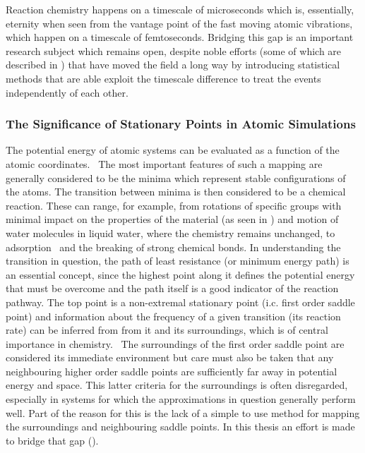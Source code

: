Reaction chemistry happens on a timescale of microseconds which is, essentially, eternity when seen from the vantage point of the fast moving atomic vibrations, which happen on a timescale of femtoseconds.
Bridging this gap is an important research subject which remains open, despite noble efforts (some of which are described in ) that have moved the field a long way by introducing statistical methods that are able exploit the timescale difference to treat the events independently of each other.~\cite{tst-eyring-1935, tst-polanyi-1935, tst-wigner-1938, htst-wert-1949, htst-vineyard-1957, tst-1990}

\subsubsection{The Significance of Stationary Points in Atomic Simulations}
The potential energy of atomic systems can be evaluated as a function of the atomic coordinates.~\cite{born-oppenheimer-1927, schrodinger-equation-1926, kohn-1999}
The most important features of such a mapping are generally considered to be the minima which represent stable configurations of the atoms.
The transition between minima is then considered to be a chemical reaction.
These can range, for example, from rotations of specific groups with minimal impact on the properties of the material (as seen in ) and motion of water molecules in liquid water, where the chemistry remains unchanged, to adsorption~ and the breaking of strong chemical bonds.
In understanding the transition in question, the path of least resistance (or minimum energy path) is an essential concept, since the highest point along it defines the potential energy that must be overcome and the path itself is a good indicator of the reaction pathway.
The top point is a non-extremal stationary point (i.c. first order saddle point) and information about the frequency of a given transition (its reaction rate) can be inferred from from it and its surroundings, which is of central importance in chemistry.~\cite{htst-wert-1949, htst-vineyard-1957}
The surroundings of the first order saddle point are considered its immediate environment but care must also be taken that any neighbouring higher order saddle points are sufficiently far away in potential energy and space.
This latter criteria for the surroundings is often disregarded, especially in systems for which the approximations in question generally perform well.
Part of the reason for this is the lack of a simple to use method for mapping the surroundings and neighbouring saddle points.
In this thesis an effort is made to bridge that gap ().

